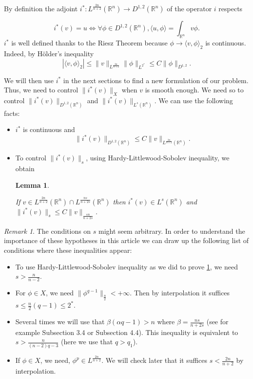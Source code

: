 \documentclass[12pt]{amsart}
\theoremstyle{plain}
\newtheorem{lemma}[theorem]{Lemma}       %
\theoremstyle{definition}
\theoremstyle{remark}
\newtheorem{remark}[theorem]{Remark}
\begin{document}
\medskip
By definition the adjoint $i^*:L^{\frac{2n}{n+2}}(\mathbb{R}^n)\rightarrow D^{1,2}(\mathbb{R}^n)$ of the operator $i$ respects

$$i^*(v)= u \iff \forall \phi \in D^{1,2}(\mathbb{R}^n), \langle u,\phi\rangle=\int_{\mathbb{R}^n} v\phi.$$ 
 $i^*$ is well defined thanks to the Riesz Theorem because $\phi \rightarrow \langle v,\phi\rangle_2$ is continuous. Indeed, by Hölder's inequality
$$|\langle v,\phi\rangle_2|\leq \|v\|_{L^{\frac{2n}{n+2}}}\|\phi\|_{L^{2^*}} \leq C\|\phi\|_{D^{1,2}}.$$



We will then use $i^*$ in the next sections to find a new formulation of our problem. Thus, we need to control $\|i^*(v)\|_X$ when $v$ is smooth enough. We need so to control $\|i^*(v)\|_{D^{1,2}(\mathbb{R}^n)}$ and $\|i^*(v)\|_{L^s(\mathbb{R}^n)}$. We can use the following facts:

\begin{itemize}
    \item $i^*$ is continuous and $$\|i^*(v)\|_{D^{1,2}(\mathbb{R}^n)}\leq C\|v\|_{L^{\frac{2n}{n+2}}(\mathbb{R}^n)}.$$ 
    \item To control $\|i^*(v)\|_s$, using Hardy-Littlewood-Sobolev inequality, we obtain
    \begin{lemma}\label{control L^s}

 If $v \in L^{\frac{2n}{n+2}}(\mathbb{R}^n)\cap L^{{\frac{ns}{n+2s}}}(\mathbb{R}^n)$ then $i^*(v) \in L^s(\mathbb{R}^n)$ and $\|i^*(v)\|_s \leq C\|v\|_{\frac{sn}{n+2s}}$.
\end{lemma}
 

\end{itemize}
\begin{remark}
    The conditions on $s$ might seem arbitrary. In order to understand the importance of these hypotheses in this article we can draw up the following list of conditions  where these inequalities appear:

    \begin{itemize}
    \item To use Hardy-Littlewood-Sobolev inequality as we did to prove \ref{control L^s}, we need $s>\frac{n}{n-2}$. 
        \item For $\phi \in X$, we need $\|\phi^{q-1}\|_\frac{n}{2} <+\infty$. Then by interpolation it suffices $s\leq\frac{n}{2}(q-1)\leq2^*.$
        \item  Several times we will use that $\beta(\alpha q-1)>n$ where $\beta = \frac{ns}{n+2s}$ (see for example Subsection 3.4 or Subsection 4.4). This inequality is equivalent to $s>\frac{n}{(n-2)q-3}$ (here we use that $q>q_1$).
        \item If $\phi \in X$, we need, $\phi^p \in L^{\frac{2n}{n+2}}$. We will check later that it suffices $s<\frac{2n}{n+2}$ by interpolation. 
    \end{itemize}
\end{remark}
\end{document}
